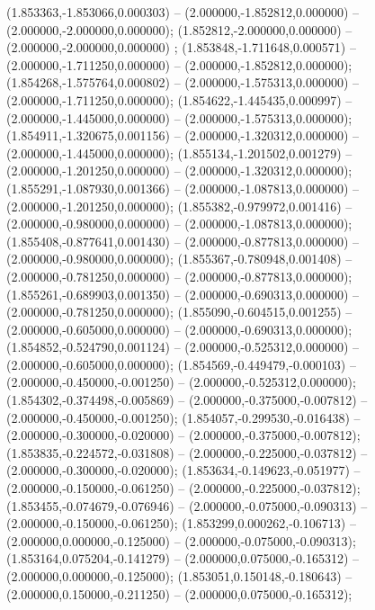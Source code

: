  (1.853363,-1.853066,0.000303) -- (2.000000,-1.852812,0.000000) -- (2.000000,-2.000000,0.000000);
 (1.852812,-2.000000,0.000000) -- (2.000000,-2.000000,0.000000) ;
 (1.853848,-1.711648,0.000571) -- (2.000000,-1.711250,0.000000) -- (2.000000,-1.852812,0.000000);
 (1.854268,-1.575764,0.000802) -- (2.000000,-1.575313,0.000000) -- (2.000000,-1.711250,0.000000);
 (1.854622,-1.445435,0.000997) -- (2.000000,-1.445000,0.000000) -- (2.000000,-1.575313,0.000000);
 (1.854911,-1.320675,0.001156) -- (2.000000,-1.320312,0.000000) -- (2.000000,-1.445000,0.000000);
 (1.855134,-1.201502,0.001279) -- (2.000000,-1.201250,0.000000) -- (2.000000,-1.320312,0.000000);
 (1.855291,-1.087930,0.001366) -- (2.000000,-1.087813,0.000000) -- (2.000000,-1.201250,0.000000);
 (1.855382,-0.979972,0.001416) -- (2.000000,-0.980000,0.000000) -- (2.000000,-1.087813,0.000000);
 (1.855408,-0.877641,0.001430) -- (2.000000,-0.877813,0.000000) -- (2.000000,-0.980000,0.000000);
 (1.855367,-0.780948,0.001408) -- (2.000000,-0.781250,0.000000) -- (2.000000,-0.877813,0.000000);
 (1.855261,-0.689903,0.001350) -- (2.000000,-0.690313,0.000000) -- (2.000000,-0.781250,0.000000);
 (1.855090,-0.604515,0.001255) -- (2.000000,-0.605000,0.000000) -- (2.000000,-0.690313,0.000000);
 (1.854852,-0.524790,0.001124) -- (2.000000,-0.525312,0.000000) -- (2.000000,-0.605000,0.000000);
 (1.854569,-0.449479,-0.000103) -- (2.000000,-0.450000,-0.001250) -- (2.000000,-0.525312,0.000000);
 (1.854302,-0.374498,-0.005869) -- (2.000000,-0.375000,-0.007812) -- (2.000000,-0.450000,-0.001250);
 (1.854057,-0.299530,-0.016438) -- (2.000000,-0.300000,-0.020000) -- (2.000000,-0.375000,-0.007812);
 (1.853835,-0.224572,-0.031808) -- (2.000000,-0.225000,-0.037812) -- (2.000000,-0.300000,-0.020000);
 (1.853634,-0.149623,-0.051977) -- (2.000000,-0.150000,-0.061250) -- (2.000000,-0.225000,-0.037812);
 (1.853455,-0.074679,-0.076946) -- (2.000000,-0.075000,-0.090313) -- (2.000000,-0.150000,-0.061250);
 (1.853299,0.000262,-0.106713) -- (2.000000,0.000000,-0.125000) -- (2.000000,-0.075000,-0.090313);
 (1.853164,0.075204,-0.141279) -- (2.000000,0.075000,-0.165312) -- (2.000000,0.000000,-0.125000);
 (1.853051,0.150148,-0.180643) -- (2.000000,0.150000,-0.211250) -- (2.000000,0.075000,-0.165312);
